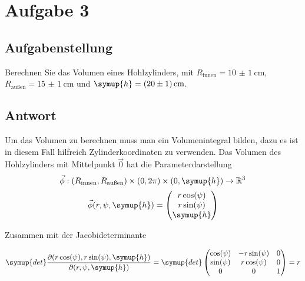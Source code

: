 \section{Aufgabe 3}

\subsection{Aufgabenstellung}
Berechnen Sie das Volumen eines Hohlzylinders, mit $R_\text{innen} = \SI{10(1)}{\centi\meter}$, \\
$R_\text{außen} = \SI{15(1)}{\centi\meter}$ und $\symup{h} = \SI{20(1)}{\centi\meter}$.
\subsection{Antwort}
Um das Volumen zu berechnen muss man ein Volumenintegral bilden, dazu es ist in diesem Fall hilfreich
Zylinderkoordinaten zu verwenden. Das Volumen des Hohlzylinders mit Mittelpunkt $\vec{0}$ hat die Parameterdarstellung
\begin{equation}
\vec{\phi} : (R_\text{innen}, R_\text{außen}) \times (0, 2\pi) \times (0,\symup{h}) \to \mathbb{R}^3
\end{equation}
\begin{equation}
\vec{\phi}(r,\psi,\symup{h}) = \begin{pmatrix}
                                r \cos(\psi) \\
                                r \sin(\psi) \\
                                \symup{h}
                                \end{pmatrix}
\end{equation}

\begin{flushleft}
Zusammen mit der Jacobideterminante
\end{flushleft}
\begin{equation}
\symup{det} \frac{\partial(r \cos(\psi), r \sin(\psi), \symup{h})}{\partial(r, \psi, \symup{h})} = 
\symup{det}         \begin{pmatrix}
                    \cos(\psi) & -r \sin(\psi) & 0 \\
                    \sin(\psi) & r \cos(\psi)  & 0 \\
                    0          & 0             & 1 \\
                    \end{pmatrix} = r
\end{equation}

